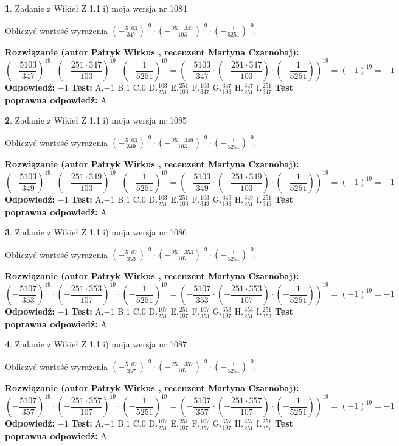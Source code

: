 \documentclass[12pt, a4paper]{article}
\theoremstyle{definition} %
\newtheorem{zad}{}
\newcommand{\zadStart}[1]{\begin{zad}#1\newline}
\newcommand{\zadStop}{\end{zad}}
\newcommand{\rozwStart}[2]{\noindent \textbf{Rozwiązanie (autor #1 , recenzent #2): }\newline}
\newcommand{\rozwStop}{\newline}
\newcommand{\odpStart}{\noindent \textbf{Odpowiedź:}\newline}
\newcommand{\odpStop}{\newline}
\newcommand{\testStart}{\noindent \textbf{Test:}\newline}
\newcommand{\testStop}{\newline}
\newcommand{\kluczStart}{\noindent \textbf{Test poprawna odpowiedź:}\newline}
\newcommand{\kluczStop}{\newline}
\begin{document}
\zadStart{Zadanie z Wikieł Z 1.1 i) moja wersja nr 1084}

Obliczyć wartość wyrażenia $(-\frac{5103}{347})^{19} \cdot (-\frac{251 \cdot 347}{103})^{19} \cdot (-\frac{1}{5251})^{19}$.
\zadStop
\rozwStart{Patryk Wirkus}{Martyna Czarnobaj}
$$(-\frac{5103}{347})^{19} \cdot (-\frac{251 \cdot 347}{103})^{19} \cdot (-\frac{1}{5251})^{19} = (-\frac{5103}{347} \cdot (-\frac{251 \cdot 347}{103}) \cdot (-\frac{1}{5251}))^{19} = (-1)^{19} = -1$$
\rozwStop
\odpStart
$-1$
\odpStop
\testStart
A.$-1$ B.$1$ C.$0$ D.$\frac{103}{251}$ E.$\frac{251}{103}$
F.$\frac{103}{347}$ G.$\frac{347}{103}$
H.$\frac{347}{251}$
I.$\frac{251}{347}$
\testStop
\kluczStart
A
\kluczStop



\zadStart{Zadanie z Wikieł Z 1.1 i) moja wersja nr 1085}

Obliczyć wartość wyrażenia $(-\frac{5103}{349})^{19} \cdot (-\frac{251 \cdot 349}{103})^{19} \cdot (-\frac{1}{5251})^{19}$.
\zadStop
\rozwStart{Patryk Wirkus}{Martyna Czarnobaj}
$$(-\frac{5103}{349})^{19} \cdot (-\frac{251 \cdot 349}{103})^{19} \cdot (-\frac{1}{5251})^{19} = (-\frac{5103}{349} \cdot (-\frac{251 \cdot 349}{103}) \cdot (-\frac{1}{5251}))^{19} = (-1)^{19} = -1$$
\rozwStop
\odpStart
$-1$
\odpStop
\testStart
A.$-1$ B.$1$ C.$0$ D.$\frac{103}{251}$ E.$\frac{251}{103}$
F.$\frac{103}{349}$ G.$\frac{349}{103}$
H.$\frac{349}{251}$
I.$\frac{251}{349}$
\testStop
\kluczStart
A
\kluczStop



\zadStart{Zadanie z Wikieł Z 1.1 i) moja wersja nr 1086}

Obliczyć wartość wyrażenia $(-\frac{5107}{353})^{19} \cdot (-\frac{251 \cdot 353}{107})^{19} \cdot (-\frac{1}{5251})^{19}$.
\zadStop
\rozwStart{Patryk Wirkus}{Martyna Czarnobaj}
$$(-\frac{5107}{353})^{19} \cdot (-\frac{251 \cdot 353}{107})^{19} \cdot (-\frac{1}{5251})^{19} = (-\frac{5107}{353} \cdot (-\frac{251 \cdot 353}{107}) \cdot (-\frac{1}{5251}))^{19} = (-1)^{19} = -1$$
\rozwStop
\odpStart
$-1$
\odpStop
\testStart
A.$-1$ B.$1$ C.$0$ D.$\frac{107}{251}$ E.$\frac{251}{107}$
F.$\frac{107}{353}$ G.$\frac{353}{107}$
H.$\frac{353}{251}$
I.$\frac{251}{353}$
\testStop
\kluczStart
A
\kluczStop



\zadStart{Zadanie z Wikieł Z 1.1 i) moja wersja nr 1087}

Obliczyć wartość wyrażenia $(-\frac{5107}{357})^{19} \cdot (-\frac{251 \cdot 357}{107})^{19} \cdot (-\frac{1}{5251})^{19}$.
\zadStop
\rozwStart{Patryk Wirkus}{Martyna Czarnobaj}
$$(-\frac{5107}{357})^{19} \cdot (-\frac{251 \cdot 357}{107})^{19} \cdot (-\frac{1}{5251})^{19} = (-\frac{5107}{357} \cdot (-\frac{251 \cdot 357}{107}) \cdot (-\frac{1}{5251}))^{19} = (-1)^{19} = -1$$
\rozwStop
\odpStart
$-1$
\odpStop
\testStart
A.$-1$ B.$1$ C.$0$ D.$\frac{107}{251}$ E.$\frac{251}{107}$
F.$\frac{107}{357}$ G.$\frac{357}{107}$
H.$\frac{357}{251}$
I.$\frac{251}{357}$
\testStop
\kluczStart
A
\kluczStop
\end{document}
